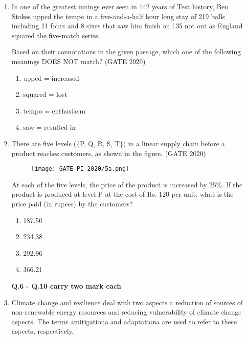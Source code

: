 \documentclass[journal,12pt,onecolumn]{IEEEtran}
\theoremstyle{remark}
\begin{document}
\begin{enumerate}
\item In one of the greatest innings ever seen in 142 years of Test history, Ben Stokes upped the tempo in a five-and-a-half hour long stay of 219 balls including 11 fours and 8 sixes that saw him finish on 135 not out as England squared the five-match series.

Based on their connotations in the given passage, which one of the following meanings DOES NOT match?
\hfill{(GATE 2020)}
\begin{multicols}{4}
\begin{enumerate}
    \item upped = increased
    \item squared = lost
    \item tempo = enthusiasm
    \item saw = resulted in
\end{enumerate}
\end{multicols}
\vspace{1cm}
\newpage
\item There are five levels (\{P, Q, R, S, T\}) in a linear supply chain before a product reaches customers, as shown in the figure.
\hfill{(GATE 2020)}

\begin{figure}[H]
    \centering
    \texttt{[image: GATE-PI-2020/5a.png]} 
    \caption{}
    \label{q5a}
\end{figure}

At each of the five levels, the price of the product is increased by 25\%. If the product is produced at level P at the cost of Rs. 120 per unit, what is the price paid (in rupees) by the customers?
\begin{multicols}{4}
\begin{enumerate}
    \item 187.50
    \item 234.38
    \item 292.96
    \item 366.21
\end{enumerate}
\end{multicols}
\vspace{1cm}
\textbf{\large Q.6 - Q.10 carry two mark each}
\item Climate change and resilience deal with two aspects a reduction of sources of non-renewable energy resources and reducing vulnerability of climate change aspects. The terms amitigationa and adaptationa are used to refer to these aspects, respectively.


\end{enumerate}
\end{document}
